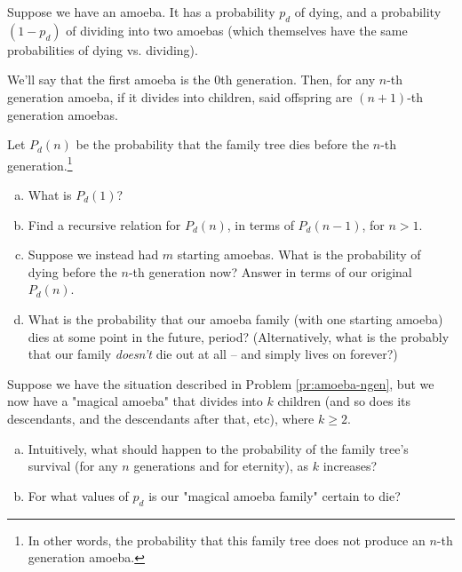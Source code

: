\begin{problem}
\label{pr:amoeba-ngen}
Suppose we have an amoeba. It has a probability $p_d$ of dying, and a probability $(1 - p_d)$ of dividing into two amoebas (which themselves have the same probabilities of dying vs. dividing). 

We'll say that the first amoeba is the 0th generation. Then, for any $n$-th generation amoeba, if it divides into children, said offspring are $(n+1)$-th generation amoebas. 

Let $P_d(n)$ be the probability that the family tree dies before the $n$-th generation.\footnote{In other words, the probability that this family tree does not produce an $n$-th generation amoeba.}


\begin{enumerate}[(a)]
\item What is $P_d(1)$?
\item Find a recursive relation for $P_d(n)$, in terms of $P_d(n-1)$, for $n > 1$. 
\item Suppose we instead had $m$ starting amoebas. What is the probability of dying before the $n$-th generation now? Answer in terms of our original $P_d(n)$.
\item What is the probability that our amoeba family (with one starting amoeba) dies at some point in the future, period? (Alternatively, what is the probably that our family \emph{doesn't} die out at all -- and simply lives on forever?) %
\end{enumerate}
\hfill
\end{problem}


\begin{problem}
\label{pr:amoeba-kdesc}
Suppose we have the situation described in Problem \ref{pr:amoeba-ngen}, but we now have a "magical amoeba" that divides into $k$ children (and so does its descendants, and the descendants after that, etc), where $k \geq 2$. 

\begin{enumerate}[(a)]
\item Intuitively, what should happen to the probability of the family tree's survival (for any $n$ generations and for eternity), as $k$ increases?
\item For what values of $p_d$ is our "magical amoeba family" certain to die?
\end{enumerate}
\end{problem}

